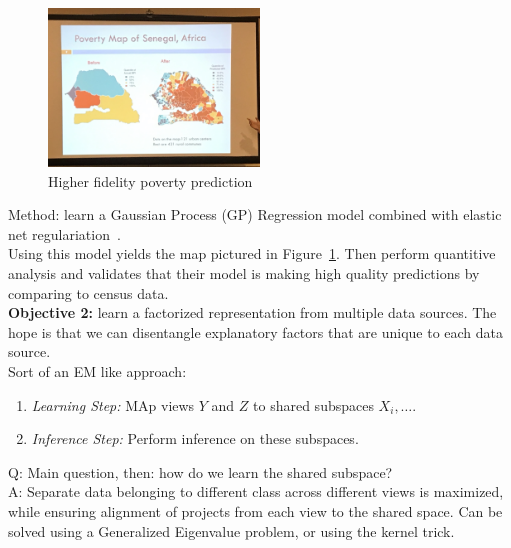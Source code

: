 \begin{figure}[h!]
    \centering
    \includegraphics[width=0.5\textwidth]{images/pov_map.JPG}
    \caption{Higher fidelity poverty prediction}
    \label{fig:pov_map}
\end{figure}


Method: learn a Gaussian Process (GP) Regression model combined with elastic net regulariation~\cite{zou2005regularization}. \\

Using this model yields the map pictured in Figure~\ref{fig:pov_map}. Then perform quantitive analysis and validates that their model is making high quality predictions by comparing to census data. \\

{\bf Objective 2:} learn a factorized representation from multiple data sources. The hope is that we can disentangle explanatory factors that are unique to each data source. \\

Sort of an EM like approach:
\begin{enumerate}
    \item {\it Learning Step:} MAp views $Y$ and $Z$ to shared subspaces $X_i, \ldots$.
    \item {\it Inference Step:} Perform inference on these subspaces.
\end{enumerate}

Q: Main question, then: how do we learn the shared subspace?\\

A: Separate data belonging to different class across different views is maximized, while ensuring alignment of projects from each view to the shared space. Can be solved using a Generalized Eigenvalue problem, or using the kernel trick.



